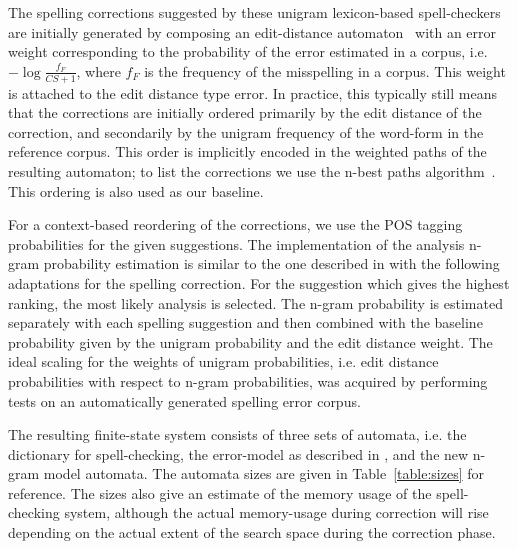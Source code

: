 \documentclass{llncs}
\begin{document}
The spelling corrections suggested by these unigram lexicon-based spell-checkers
are initially generated by composing an edit-distance automaton~\cite{agata/2002} 
with an  error weight corresponding to the probability of the error
estimated in a corpus, i.e. $-\log\frac{f_{F}}{CS+1}$, where $f_F$ is the frequency
of the misspelling in a corpus. This weight is attached to the edit distance type
error. In practice, this typically still means that the corrections are
initially ordered primarily by the edit distance of the correction, and
secondarily by the unigram frequency of the word-form in the reference corpus.
This order is implicitly encoded in the weighted paths of the resulting
automaton; to list the corrections we use the n-best paths
algorithm~\cite{mohri/2002}. This ordering is also used as our baseline.

For a context-based reordering of the corrections, we use the POS tagging
probabilities for the given suggestions. The implementation of the analysis n-gram
probability estimation is similar to the one described in \cite{silfverberg/2011} with
the following adaptations for the spelling correction. For the suggestion which gives
the highest ranking, the most likely analysis is selected.  The n-gram probability
is estimated separately with each spelling suggestion and then combined with
the baseline probability given by the unigram probability and the edit distance
weight. The ideal scaling for the weights of unigram probabilities, i.e.
edit distance probabilities with respect to n-gram probabilities, was acquired
by performing tests on an automatically generated spelling error corpus.


The resulting finite-state system consists of three sets of automata, i.e. the dictionary
for spell-checking, the error-model as described in
\cite{pirinen/2010/lrec}, and the new n-gram model automata. The automata
sizes are given in Table~\ref{table:sizes} for reference. The sizes also
give an estimate of the memory usage of the spell-checking system, although the
actual memory-usage during correction will rise depending on the actual
extent of the search space during the correction phase.
\end{document}
